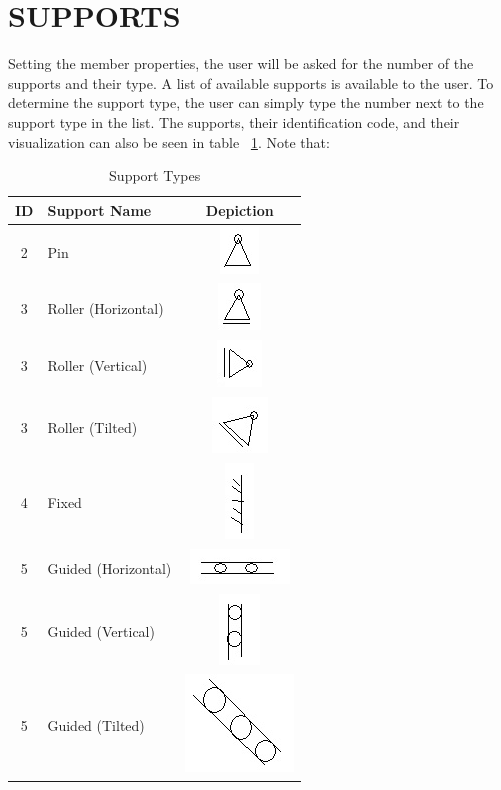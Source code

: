 \documentclass{article}
\begin{document}
\section{SUPPORTS}
Setting the member properties, the user will be asked for the number of the supports and their type. A list of available supports is available to the user. To determine the support type, the user can simply type the number next to the support type in the list. The supports, their identification code, and their visualization can also be seen in table ~\ref{tbl1}. Note that:
\begin{table}
\centering
\caption{Support Types}
\label{tbl1}
\begin{tabular}{|c|l|c|}
\hline ID & Support Name & Depiction\\
\hline 2 & Pin & \includegraphics[height=.5cm]{pin.jpg}\\
\hline 3 & Roller (Horizontal) & \includegraphics[height=.5cm]{rollerh.jpg}\\
\hline 3 & Roller (Vertical) &  \includegraphics[height=.5cm]{rollerv.jpg}\\
\hline 3 &Roller (Tilted) & \includegraphics[height=.5cm]{rollert.jpg}\\
\hline 4 & Fixed & \includegraphics[height=.6cm]{fixed.jpg}\\
\hline 5 & Guided (Horizontal) & \includegraphics[height=.5cm]{guideh.jpg}\\
\hline 5 &Guided (Vertical) & \includegraphics[height=.6cm]{guidev.jpg}\\
\hline 5 & Guided (Tilted) & \includegraphics[height=.5cm]{guidet.jpg}\\
\hline
\end{tabular}
\end{table}
\end{document}
